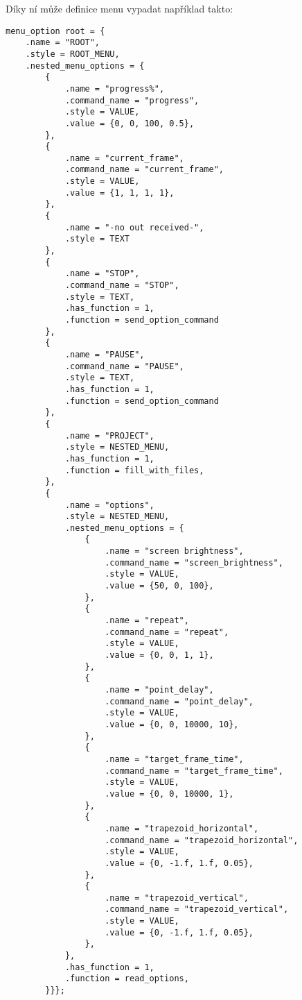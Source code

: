Díky ní může definice menu vypadat například takto:

\begin{verbatim}
menu_option root = {
    .name = "ROOT",
    .style = ROOT_MENU,
    .nested_menu_options = {
        {
            .name = "progress%",
            .command_name = "progress",
            .style = VALUE,
            .value = {0, 0, 100, 0.5},
        },
        {
            .name = "current_frame",
            .command_name = "current_frame",
            .style = VALUE,
            .value = {1, 1, 1, 1},
        },
        {
            .name = "-no out received-",
            .style = TEXT
        },
        {
            .name = "STOP",
            .command_name = "STOP",
            .style = TEXT,
            .has_function = 1,
            .function = send_option_command
        },
        {
            .name = "PAUSE",
            .command_name = "PAUSE",
            .style = TEXT,
            .has_function = 1,
            .function = send_option_command
        },
        {
            .name = "PROJECT",
            .style = NESTED_MENU,
            .has_function = 1,
            .function = fill_with_files,
        },
        {
            .name = "options",
            .style = NESTED_MENU,
            .nested_menu_options = {
                {
                    .name = "screen brightness",
                    .command_name = "screen_brightness",
                    .style = VALUE,
                    .value = {50, 0, 100},
                },
                {
                    .name = "repeat",
                    .command_name = "repeat",
                    .style = VALUE,
                    .value = {0, 0, 1, 1},
                },
                {
                    .name = "point_delay",
                    .command_name = "point_delay",
                    .style = VALUE,
                    .value = {0, 0, 10000, 10},
                },
                {
                    .name = "target_frame_time",
                    .command_name = "target_frame_time",
                    .style = VALUE,
                    .value = {0, 0, 10000, 1},
                },
                {
                    .name = "trapezoid_horizontal",
                    .command_name = "trapezoid_horizontal",
                    .style = VALUE,
                    .value = {0, -1.f, 1.f, 0.05},
                },
                {
                    .name = "trapezoid_vertical",
                    .command_name = "trapezoid_vertical",
                    .style = VALUE,
                    .value = {0, -1.f, 1.f, 0.05},
                },
            },
            .has_function = 1,
            .function = read_options,
        }}};
\end{verbatim}

